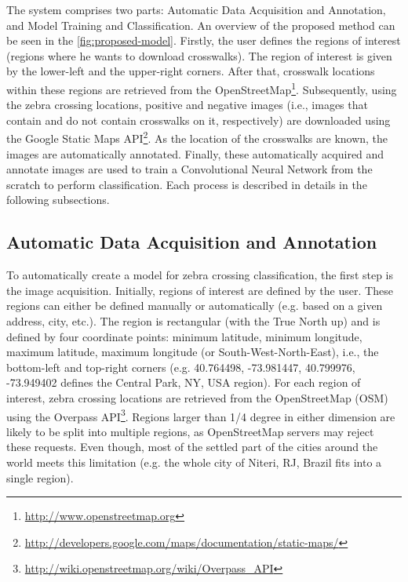 \documentclass[journal]{IEEEtran}
\newcommand{\GoogleStaticMapsAPI}{Google Static Maps API\xspace}
\newcommand{\OpenStreetMap}{OpenStreetMap\xspace}
\begin{document}
The system comprises two parts: Automatic Data Acquisition and Annotation, and Model Training and Classification. An overview of the proposed method can be seen in the \autoref{fig:proposed-model}. Firstly, the user defines the regions of interest (regions where he wants to download crosswalks). The region of interest is given by the lower-left and the upper-right corners. After that, crosswalk locations within these regions are retrieved from the \OpenStreetMap\footnote{\url{http://www.openstreetmap.org}}. Subsequently, using the zebra crossing locations, positive and negative images (i.e., images that contain and do not contain crosswalks on it, respectively) are downloaded using the \GoogleStaticMapsAPI\footnote{\url{http://developers.google.com/maps/documentation/static-maps/}}. As the location of the crosswalks are known, the images are automatically annotated. Finally, these automatically acquired and annotate images are used to train a Convolutional Neural Network from the scratch to perform classification. Each process is described in details in the following subsections.

\subsection{Automatic Data Acquisition and Annotation}
To automatically create a model for zebra crossing classification, the first step is the image acquisition. Initially, regions of interest are defined by the user. These regions can either be defined manually or automatically (e.g. based on a given address, city, etc.). The region is rectangular (with the True North up) and is defined by four coordinate points: minimum latitude, minimum longitude, maximum latitude, maximum longitude (or South-West-North-East), i.e., the bottom-left and top-right corners (e.g. 40.764498, -73.981447, 40.799976, -73.949402 defines the Central Park, NY, USA region). For each region of interest, zebra crossing locations are retrieved from the OpenStreetMap (OSM) using the Overpass API\footnote{\url{http://wiki.openstreetmap.org/wiki/Overpass_API}}. Regions larger than 1/4 degree in either dimension are likely to be split into multiple regions, as OpenStreetMap servers may reject these requests. Even though, most of the settled part of the cities around the world meets this limitation (e.g. the whole city of Niteri, RJ, Brazil fits into a single region).
\end{document}
